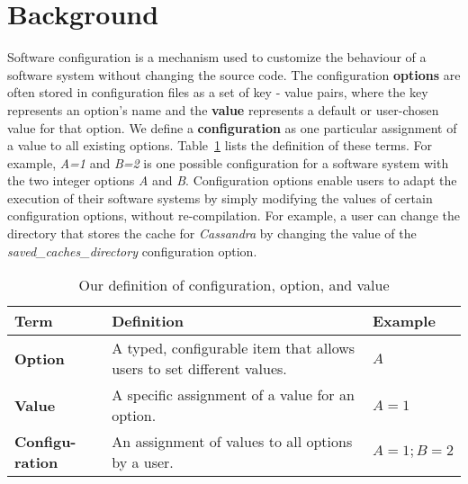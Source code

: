 
\section{Background}
\label{sec:back}



Software configuration is a mechanism used to customize the behaviour of a software system without changing the source code. The configuration \textbf{options} are often stored in configuration files as a set of key - value pairs, where the key represents an option's name and the \textbf{value} represents a default or user-chosen value for that option. We define a \textbf{configuration} as one particular assignment of a value to all existing options. Table~\ref{tab:terms} lists the definition of these terms. For example, \emph{A=1} and \emph{B=2} is one possible configuration for a software system with the two integer options \emph{A} and \emph{B}. Configuration options enable users to adapt the execution of their software systems by simply modifying the values of certain configuration options, without re-compilation. For example, a user can change the directory that stores the cache for \emph{Cassandra} by changing the value of the \textit{saved\_caches\_directory} configuration option.%

\begin{table}[t]
    \centering
    \footnotesize
    \tabcolsep=0.05cm
    \caption{Our definition of configuration, option, and value}
    \begin{tabular}{p{1.1cm}|p{5.8cm}|l}
        \hline
        Term & Definition & Example \\
        \hline
        \textbf{Option}  & A typed, configurable item that allows users to set different values. & $A$ \\
        \textbf{Value} & A specific assignment of a value for an option. & $A = 1$ \\
        \textbf{Configu-ration} & An assignment of values to all options by a user. & $A = 1; B = 2$ \\
        \hline
    \end{tabular}
    \label{tab:terms}
\end{table}


